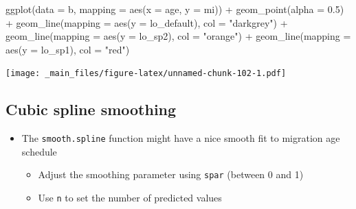 \documentclass[
]{book}
\newenvironment{Shaded}{\begin{snugshade}}{\end{snugshade}}
\newcommand{\AttributeTok}[1]{\textcolor[rgb]{0.77,0.63,0.00}{#1}}
\newcommand{\FloatTok}[1]{\textcolor[rgb]{0.00,0.00,0.81}{#1}}
\newcommand{\FunctionTok}[1]{\textcolor[rgb]{0.00,0.00,0.00}{#1}}
\newcommand{\NormalTok}[1]{#1}
\newcommand{\SpecialCharTok}[1]{\textcolor[rgb]{0.00,0.00,0.00}{#1}}
\newcommand{\StringTok}[1]{\textcolor[rgb]{0.31,0.60,0.02}{#1}}
\providecommand{\tightlist}{%
  \setlength{\itemsep}{0pt}\setlength{\parskip}{0pt}}
\begin{document}
\begin{Shaded}
\begin{Highlighting}[]
\FunctionTok{ggplot}\NormalTok{(}\AttributeTok{data =}\NormalTok{ b, }
       \AttributeTok{mapping =} \FunctionTok{aes}\NormalTok{(}\AttributeTok{x =}\NormalTok{ age, }\AttributeTok{y =}\NormalTok{ mi)) }\SpecialCharTok{+}
  \FunctionTok{geom\_point}\NormalTok{(}\AttributeTok{alpha =} \FloatTok{0.5}\NormalTok{) }\SpecialCharTok{+} 
  \FunctionTok{geom\_line}\NormalTok{(}\AttributeTok{mapping =} \FunctionTok{aes}\NormalTok{(}\AttributeTok{y =}\NormalTok{ lo\_default), }\AttributeTok{col =} \StringTok{"darkgrey"}\NormalTok{) }\SpecialCharTok{+}
  \FunctionTok{geom\_line}\NormalTok{(}\AttributeTok{mapping =} \FunctionTok{aes}\NormalTok{(}\AttributeTok{y =}\NormalTok{ lo\_sp2), }\AttributeTok{col =} \StringTok{"orange"}\NormalTok{) }\SpecialCharTok{+}
  \FunctionTok{geom\_line}\NormalTok{(}\AttributeTok{mapping =} \FunctionTok{aes}\NormalTok{(}\AttributeTok{y =}\NormalTok{ lo\_sp1), }\AttributeTok{col =} \StringTok{"red"}\NormalTok{)}
\end{Highlighting}
\end{Shaded}

\texttt{[image: \_main\_files/figure-latex/unnamed-chunk-102-1.pdf]}

\hypertarget{cubic-spline-smoothing}{%
\subsection{Cubic spline smoothing}\label{cubic-spline-smoothing}}

\begin{itemize}
\tightlist
\item
  The \texttt{smooth.spline} function might have a nice smooth fit to migration age schedule

  \begin{itemize}
  \tightlist
  \item
    Adjust the smoothing parameter using \texttt{spar} (between 0 and 1)
  \item
    Use \texttt{n} to set the number of predicted values
  \end{itemize}
\end{itemize}
\end{document}
